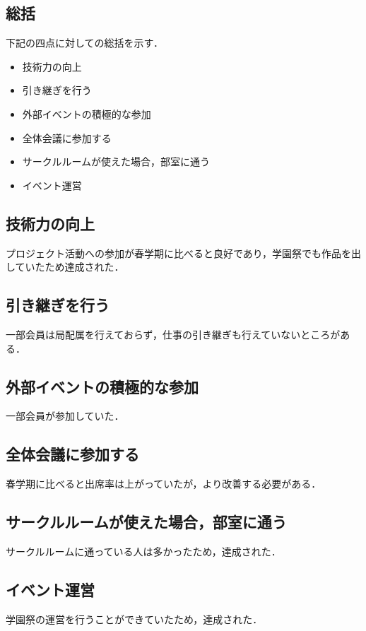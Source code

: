 \subsection*{\secondGrade{}総括}


下記の四点に対しての総括を示す．
\begin{itemize}
    \item 技術力の向上
    \item 引き継ぎを行う
    \item 外部イベントの積極的な参加
    \item 全体会議に参加する
    \item サークルルームが使えた場合，部室に通う
    \item イベント運営
\end{itemize}

\subsection*{技術力の向上}
プロジェクト活動への参加が春学期に比べると良好であり，学園祭でも作品を出していたため達成された．
\subsection*{引き継ぎを行う}
一部会員は局配属を行えておらず，仕事の引き継ぎも行えていないところがある．
\subsection*{外部イベントの積極的な参加}
一部会員が参加していた．
\subsection*{全体会議に参加する}
春学期に比べると出席率は上がっていたが，より改善する必要がある．
\subsection*{サークルルームが使えた場合，部室に通う}
サークルルームに通っている人は多かったため，達成された．
\subsection*{イベント運営}
学園祭の運営を行うことができていたため，達成された．
